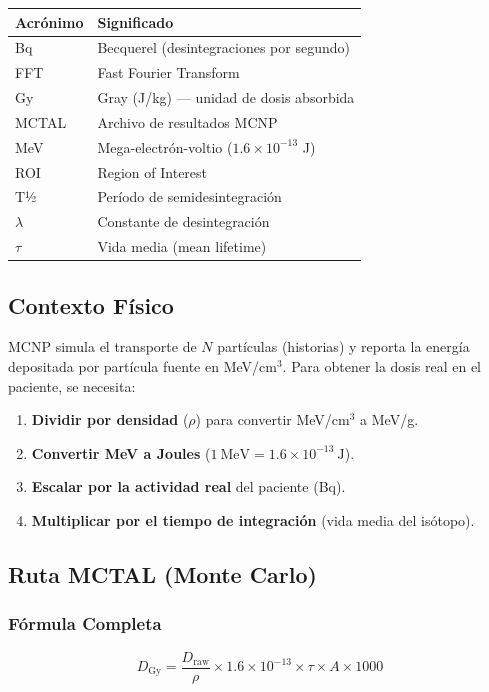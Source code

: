 \documentclass[12pt,a4paper]{article}
\begin{document}
\begin{tabular}{p{3cm} p{12cm}}
\toprule
\textbf{Acrónimo} & \textbf{Significado} \\
\midrule
Bq & Becquerel (desintegraciones por segundo) \\
FFT & Fast Fourier Transform \\
Gy & Gray (J/kg) --- unidad de dosis absorbida \\
MCTAL & Archivo de resultados MCNP \\
MeV & Mega-electrón-voltio ($1.6\times10^{-13}$ J) \\
ROI & Region of Interest \\
T½ & Período de semidesintegración \\
$\lambda$ & Constante de desintegración \\
$\tau$ & Vida media (mean lifetime) \\
\bottomrule
\end{tabular}

\subsection{Contexto Físico}

MCNP simula el transporte de $N$ partículas (historias) y reporta la energía depositada por partícula fuente en MeV/cm$^3$. Para obtener la dosis real en el paciente, se necesita:

\begin{enumerate}
  \item \textbf{Dividir por densidad} ($\rho$) para convertir MeV/cm$^3$ a MeV/g.
  \item \textbf{Convertir MeV a Joules} ($1\ \text{MeV} = 1.6\times10^{-13}\ \text{J}$).
  \item \textbf{Escalar por la actividad real} del paciente (Bq).
  \item \textbf{Multiplicar por el tiempo de integración} (vida media del isótopo).
\end{enumerate}

\subsection{Ruta MCTAL (Monte Carlo)}

\subsubsection{Fórmula Completa}

$$D_{\text{Gy}} = \frac{D_{\text{raw}}}{\rho} \times 1.6\times10^{-13} \times \tau \times A \times 1000$$
\end{document}
